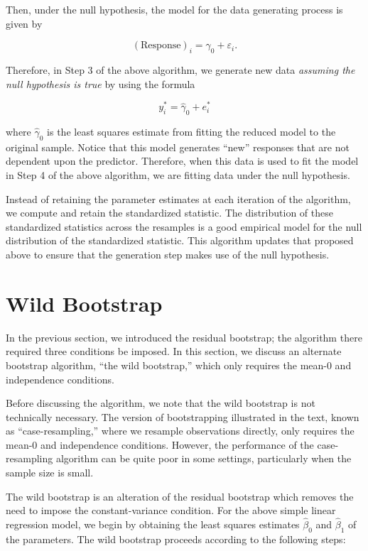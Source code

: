 \documentclass[
  letterpaper,
  DIV=11,
  numbers=noendperiod]{scrreprt}
\theoremstyle{definition}
\theoremstyle{definition}
\theoremstyle{plain}
\theoremstyle{remark}
\begin{document}
Then, under the null hypothesis, the model for the data generating
process is given by

\[(\text{Response})_i = \gamma_0 + \varepsilon_i.\]

Therefore, in Step 3 of the above algorithm, we generate new data
\emph{assuming the null hypothesis is true} by using the formula

\[y_i^* = \widehat{\gamma}_0 + e_i^*\]

where \(\widehat{\gamma}_0\) is the least squares estimate from fitting
the reduced model to the original sample. Notice that this model
generates ``new'' responses that are not dependent upon the predictor.
Therefore, when this data is used to fit the model in Step 4 of the
above algorithm, we are fitting data under the null hypothesis.

Instead of retaining the parameter estimates at each iteration of the
algorithm, we compute and retain the standardized statistic. The
distribution of these standardized statistics across the resamples is a
good empirical model for the null distribution of the standardized
statistic. This algorithm updates that proposed above to ensure that the
generation step makes use of the null hypothesis.

\section{Wild Bootstrap}\label{wild-bootstrap}

In the previous section, we introduced the residual bootstrap; the
algorithm there required three conditions be imposed. In this section,
we discuss an alternate bootstrap algorithm, ``the wild bootstrap,''
which only requires the mean-0 and independence conditions.

Before discussing the algorithm, we note that the wild bootstrap is not
technically necessary. The version of bootstrapping illustrated in the
text, known as ``case-resampling,'' where we resample observations
directly, only requires the mean-0 and independence conditions. However,
the performance of the case-resampling algorithm can be quite poor in
some settings, particularly when the sample size is small.

The wild bootstrap is an alteration of the residual bootstrap which
removes the need to impose the constant-variance condition. For the
above simple linear regression model, we begin by obtaining the least
squares estimates \(\widehat{\beta}_0\) and \(\widehat{\beta}_1\) of the
parameters. The wild bootstrap proceeds according to the following
steps:
\end{document}
